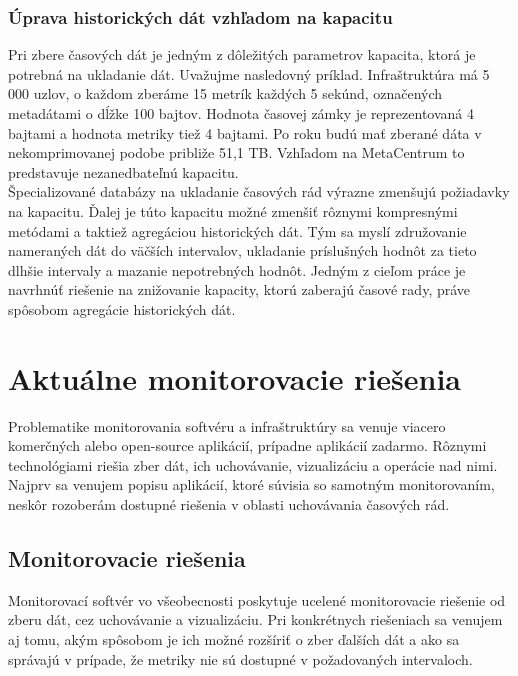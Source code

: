 \documentclass[printed,11pt,twoside,color,cover,table]{fithesis3}
\begin{document}
\subsection{Úprava historických dát vzhľadom na kapacitu}
\label{sec:example}
Pri zbere časových dát je jedným z dôležitých parametrov kapacita, ktorá je potrebná na ukladanie dát. Uvažujme nasledovný príklad. Infraštruktúra má 5 000 uzlov, o každom zberáme 15 metrík každých 5 sekúnd,
označených metadátami o dĺžke 100 bajtov. Hodnota časovej zámky je reprezentovaná 4 bajtami a hodnota metriky tiež 4 bajtami. Po roku budú mať zberané dáta v nekomprimovanej podobe približe 51,1 TB. 
Vzhľadom na MetaCentrum to predstavuje nezanedbateľnú kapacitu.
\\Špecializované databázy na ukladanie časových rád výrazne zmenšujú požiadavky na kapacitu. Ďalej je túto kapacitu možné zmenšiť 
rôznymi kompresnými metódami a taktiež agregáciou historických dát. Tým sa myslí združovanie nameraných dát do väčších intervalov,
ukladanie príslušných hodnôt za tieto dlhšie intervaly a mazanie nepotrebných hodnôt. Jedným z cieľom práce je navrhnúť riešenie na znižovanie kapacity, ktorú zaberajú časové rady,
práve spôsobom agregácie historických dát.

\chapter{Aktuálne monitorovacie riešenia}
Problematike monitorovania softvéru a infraštruktúry sa venuje viacero komerčných alebo open-source aplikácií, prípadne aplikácií zadarmo. Rôznymi technológiami riešia zber dát, ich uchovávanie, vizualizáciu a operácie nad
nimi. Najprv sa venujem popisu aplikácií, ktoré súvisia so samotným monitorovaním, neskôr rozoberám dostupné riešenia v oblasti uchovávania časových rád.

\section{Monitorovacie riešenia}
Monitorovací softvér vo všeobecnosti poskytuje ucelené monitorovacie riešenie od zberu dát, cez uchovávanie a vizualizáciu. Pri konkrétnych riešeniach sa venujem aj tomu, akým spôsobom je ich možné
rozšíriť o zber ďalších dát a ako sa správajú v prípade, že metriky nie sú dostupné v požadovaných intervaloch.
\end{document}
